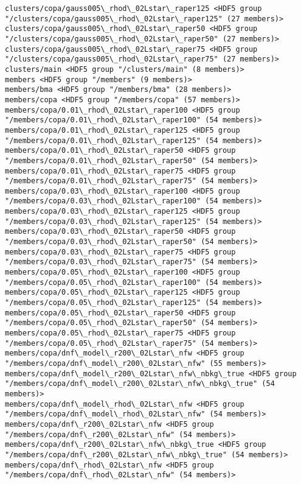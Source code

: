 \documentclass[11pt]{article}
\begin{document}
\begin{Verbatim}[commandchars=\\\{\}]
clusters/copa/gauss005\_rhod\_02Lstar\_raper125 <HDF5 group "/clusters/copa/gauss005\_rhod\_02Lstar\_raper125" (27 members)>
clusters/copa/gauss005\_rhod\_02Lstar\_raper50 <HDF5 group "/clusters/copa/gauss005\_rhod\_02Lstar\_raper50" (27 members)>
clusters/copa/gauss005\_rhod\_02Lstar\_raper75 <HDF5 group "/clusters/copa/gauss005\_rhod\_02Lstar\_raper75" (27 members)>
clusters/main <HDF5 group "/clusters/main" (8 members)>
members <HDF5 group "/members" (9 members)>
members/bma <HDF5 group "/members/bma" (28 members)>
members/copa <HDF5 group "/members/copa" (57 members)>
members/copa/0.01\_rhod\_02Lstar\_raper100 <HDF5 group "/members/copa/0.01\_rhod\_02Lstar\_raper100" (54 members)>
members/copa/0.01\_rhod\_02Lstar\_raper125 <HDF5 group "/members/copa/0.01\_rhod\_02Lstar\_raper125" (54 members)>
members/copa/0.01\_rhod\_02Lstar\_raper50 <HDF5 group "/members/copa/0.01\_rhod\_02Lstar\_raper50" (54 members)>
members/copa/0.01\_rhod\_02Lstar\_raper75 <HDF5 group "/members/copa/0.01\_rhod\_02Lstar\_raper75" (54 members)>
members/copa/0.03\_rhod\_02Lstar\_raper100 <HDF5 group "/members/copa/0.03\_rhod\_02Lstar\_raper100" (54 members)>
members/copa/0.03\_rhod\_02Lstar\_raper125 <HDF5 group "/members/copa/0.03\_rhod\_02Lstar\_raper125" (54 members)>
members/copa/0.03\_rhod\_02Lstar\_raper50 <HDF5 group "/members/copa/0.03\_rhod\_02Lstar\_raper50" (54 members)>
members/copa/0.03\_rhod\_02Lstar\_raper75 <HDF5 group "/members/copa/0.03\_rhod\_02Lstar\_raper75" (54 members)>
members/copa/0.05\_rhod\_02Lstar\_raper100 <HDF5 group "/members/copa/0.05\_rhod\_02Lstar\_raper100" (54 members)>
members/copa/0.05\_rhod\_02Lstar\_raper125 <HDF5 group "/members/copa/0.05\_rhod\_02Lstar\_raper125" (54 members)>
members/copa/0.05\_rhod\_02Lstar\_raper50 <HDF5 group "/members/copa/0.05\_rhod\_02Lstar\_raper50" (54 members)>
members/copa/0.05\_rhod\_02Lstar\_raper75 <HDF5 group "/members/copa/0.05\_rhod\_02Lstar\_raper75" (54 members)>
members/copa/dnf\_model\_r200\_02Lstar\_nfw <HDF5 group "/members/copa/dnf\_model\_r200\_02Lstar\_nfw" (55 members)>
members/copa/dnf\_model\_r200\_02Lstar\_nfw\_nbkg\_true <HDF5 group "/members/copa/dnf\_model\_r200\_02Lstar\_nfw\_nbkg\_true" (54 members)>
members/copa/dnf\_model\_rhod\_02Lstar\_nfw <HDF5 group "/members/copa/dnf\_model\_rhod\_02Lstar\_nfw" (54 members)>
members/copa/dnf\_r200\_02Lstar\_nfw <HDF5 group "/members/copa/dnf\_r200\_02Lstar\_nfw" (54 members)>
members/copa/dnf\_r200\_02Lstar\_nfw\_nbkg\_true <HDF5 group "/members/copa/dnf\_r200\_02Lstar\_nfw\_nbkg\_true" (54 members)>
members/copa/dnf\_rhod\_02Lstar\_nfw <HDF5 group "/members/copa/dnf\_rhod\_02Lstar\_nfw" (54 members)>

\end{Verbatim}
\end{document}
